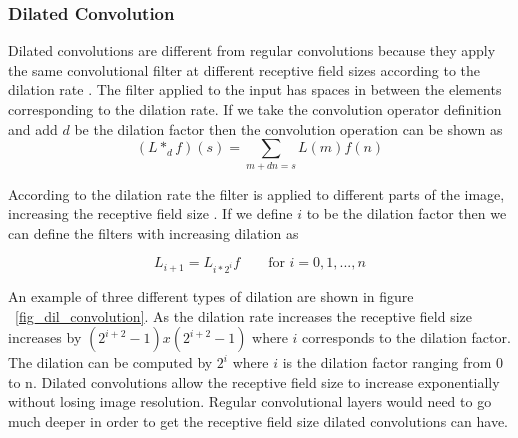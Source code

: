 \subsubsection{Dilated Convolution}
    Dilated convolutions are different from regular convolutions because they apply the same convolutional filter at different receptive field sizes according to the dilation rate \cite{Yu2016MultiScaleCA}.
    The filter applied to the input has spaces in between the elements corresponding to the dilation rate.
    If we take the convolution operator definition and add $d$ be the dilation factor then the convolution operation can be shown as 
\begin{equation}
 (L *_d f)(s) = \sum_{m+dn=s} L(m)f(n)\label{eq:dilconvolution}
\end{equation}

     According to the dilation rate the filter is applied to different parts of the image, increasing the receptive field size \cite{DBLP:journals/corr/ChenPSA17}. 
     If we define $i$ to be the dilation factor then we can define the filters with increasing dilation as
    
\begin{equation}
 L_{i+1} = L_{i*2^i} f \qquad \mbox{for   } i = 0,1,...,n\label{eq:dilatedrate} 
\end{equation}
    
    An example of three different types of dilation are shown in figure ~\ref{fig_dil_convolution}.
    As the dilation rate increases the receptive field size increases by $(2^{i+2}-1)x(2^{i+2}-1)$ where $i$ corresponds to the dilation factor.
    The dilation can be computed by $2^i$ where $i$ is the dilation factor ranging from 0 to n. 
    Dilated convolutions allow the receptive field size to increase exponentially without losing image resolution.
    Regular convolutional layers would need to go much deeper in order to get the receptive field size dilated convolutions can have.
    
